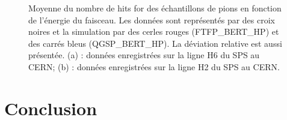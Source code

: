 \begin{figure}[!ht]
      \caption{Moyenne du nombre de hits for des échantillons de pions en fonction de l'énergie du faisceau. Les données sont représentés par des croix noires et la simulation par des cerles rouges (FTFP\_BERT\_HP) et des carrés bleus (QGSP\_BERT\_HP). La déviation relative est aussi présentée. (a) : données enregistrées sur la ligne H6 du SPS au CERN; (b) : données enregistrées sur la ligne H2 du SPS au CERN.}
  \label{fig.nhit_pi-_ebeam}
\end{figure}


\section{Conclusion}
